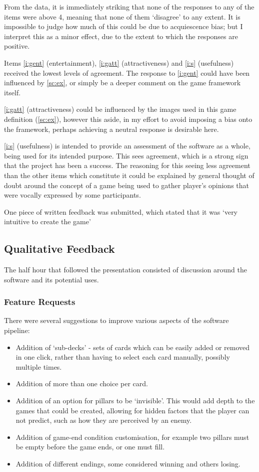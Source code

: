 From the data, it is immediately striking that none of the responses to any of the items were above 4, meaning that none of them `disagree' to any extent. It is impossible to judge how much of this could be due to acquiescence bias; but I interpret this as a minor effect, due to the extent to which the responses are positive.

Items \ref{i:gent} (entertainment), \ref{i:gatt} (attractiveness) and \ref{i:s} (usefulness) received the lowest levels of agreement. The response to \ref{i:gent} could have been influenced by \ref{sc:ex}, or simply be a deeper comment on the game framework itself. 

\ref{i:gatt} (attractiveness) could be influenced by the images used in this game definition (\ref{sc:ex}), however this aside, in my effort to avoid imposing a bias onto the framework, perhaps achieving a neutral response is desirable here.

\ref{i:s} (usefulness) is intended to provide an assessment of the software as a whole, being used for its intended purpose. This sees agreement, which is a strong sign that the project has been a success. The reasoning for this seeing less agreement than the other items which constitute it could be explained by general thought of doubt around the concept of a game being used to gather player's opinions that were vocally expressed by some participants.

One piece of written feedback was submitted, which stated that it was `very intuitive to create the game'

\subsection{Qualitative Feedback}
The half hour that followed the presentation consisted of discussion around the software and its potential uses.

\subsubsection{Feature Requests}
There were several suggestions to improve various aspects of the software pipeline:

\begin{itemize}
    \item Addition of `sub-decks' - sets of cards which can be easily added or removed in one click, rather than having to select each card manually, possibly multiple times. 
    \item Addition of more than one choice per card.
    \item Addition of an option for pillars to be `invisible'. This would add depth to the games that could be created, allowing for hidden factors that the player can not predict, such as how they are perceived by an enemy.
    \item Addition of game-end condition customisation, for example two pillars must be empty before the game ends, or one must fill.
    \item Addition of different endings, some considered winning and others losing.
\end{itemize}

